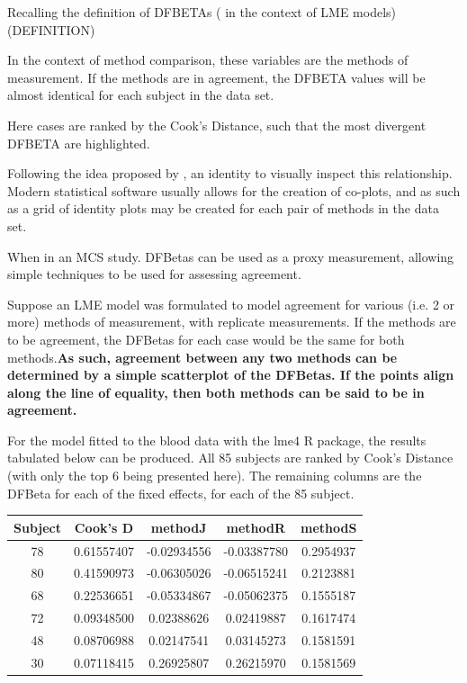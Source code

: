 \documentclass[12pt, a4paper]{report}
\theoremstyle{plain}
\theoremstyle{definition}
\theoremstyle{remark}
\begin{document}
	Recalling the definition of DFBETAs ( in the context of LME models) (DEFINITION)
	
	In the context of method comparison, these variables are the methods of measurement. If the methods are in agreement, the DFBETA values will be almost identical for each subject in
	the data set.
	
	Here cases are ranked by the Cook's Distance, such that the most divergent DFBETA are highlighted.
	
	
	
	Following the idea proposed by \citet{BA86}, an identity to visually inspect this relationship. Modern statistical software usually allows for the creation of co-plots, and as such as
	a grid of identity plots may be created for each pair of methods in the data set.
	
	
	When in an MCS study. DFBetas can be used as a proxy measurement, allowing simple techniques to be used for assessing agreement.
	
	Suppose an LME model was formulated to model agreement for various (i.e. 2 or more) methods of measurement, with replicate measurements. If the methods are to be agreement, the DFBetas for each case would be the same for both methods.\textbf{As such, agreement between any two methods can be determined by a simple scatterplot of the DFBetas. If the points align along the line of equality, then both methods can be said to be in agreement.}
	
	For the model fitted to the blood data with the lme4 R package, the results tabulated below can be produced. All 85 subjects are ranked by Cook's Distance (with only the top 6 being presented here). The remaining columns are the DFBeta for each of the fixed effects, for each of the 85 subject.
	\begin{center}
		\begin{tabular}{|c|c|c|c|c|} \hline
			Subject &    Cook's D  &    methodJ  &   methodR  & methodS \\ \hline \hline
			78 & 0.61557407 & -0.02934556 & -0.03387780 & 0.2954937  \\ \hline
			80 & 0.41590973 & -0.06305026 & -0.06515241 & 0.2123881  \\ \hline
			68 & 0.22536651 & -0.05334867 & -0.05062375 & 0.1555187  \\ \hline
			72 & 0.09348500  & 0.02388626  & 0.02419887 & 0.1617474  \\ \hline
			48 & 0.08706988  & 0.02147541  & 0.03145273 & 0.1581591  \\ \hline
			30 & 0.07118415  & 0.26925807  & 0.26215970 & 0.1581569  \\ \hline
		\end{tabular}
	\end{center}
	
\end{document}
